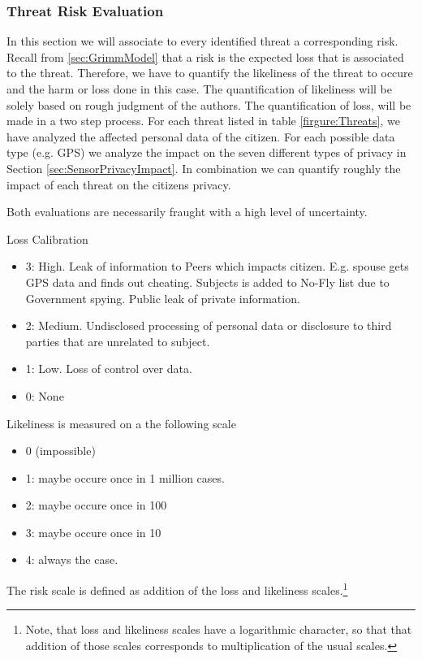 \subsubsection{Threat Risk Evaluation}

In this section we will associate to every identified threat a corresponding risk.
Recall from \ref{sec:GrimmModel} that a risk is the expected loss that is associated to the threat.
Therefore, we have to quantify the likeliness of the threat to occure and the harm or loss done in this case.
The quantification of likeliness will be solely based on rough judgment of the authors.
The quantification of loss, will be made in a two step process.
For each threat listed in table \ref{firgure:Threats}, we have analyzed the affected personal data of the citizen.
For each possible data type (e.g. GPS) we analyze the impact on the seven different types of privacy in Section \ref{sec:SensorPrivacyImpact}.
In combination we can quantify roughly the impact of each threat on the citizens privacy.

Both evaluations are necessarily fraught with a high level of uncertainty.

Loss Calibration
\begin{itemize}
\item 3: High. Leak of information to Peers which impacts citizen.
  E.g. spouse gets GPS data and finds out cheating.
  Subjects is added to No-Fly list due to Government spying.
  Public leak of private information.
\item 2: Medium. Undisclosed processing of personal data or disclosure to third parties that are unrelated to subject.
\item 1: Low. Loss of control over data.
\item 0: None
\end{itemize}

Likeliness is measured on a the following scale
\begin{itemize}
\item 0 (impossible)
\item 1: maybe occure once in 1 million cases.
\item 2: maybe occure once in 100
\item 3: maybe occure once in 10
\item 4: always the case.
\end{itemize}
The risk scale is defined as addition of the loss and likeliness scales.\footnote{
Note, that loss and likeliness scales have a logarithmic character, so that that addition of those scales corresponds to multiplication of the usual scales.
}

